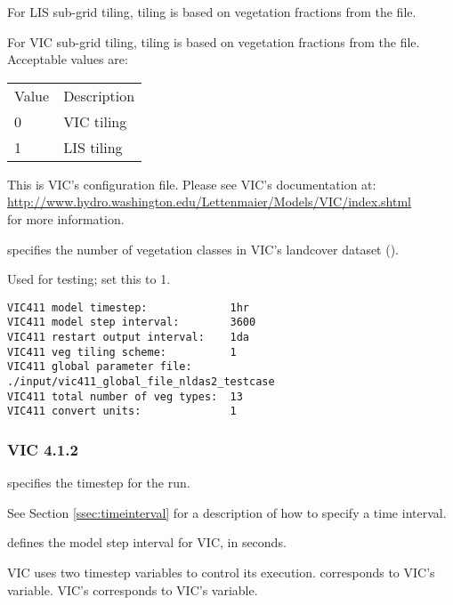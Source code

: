  For LIS sub-grid tiling, tiling is based on vegetation fractions
 from the  file.

 For VIC sub-grid tiling, tiling is based on vegetation fractions
 from the  file.
 Acceptable values are:

 \begin{tabular}{ll}
 Value & Description \\
 0     & VIC tiling  \\
 1     & LIS tiling  \\
 \end{tabular}

  This is VIC's
 configuration file.  Please see VIC's documentation at: \\
 \hyperref{http://www.hydro.washington.edu/Lettenmaier/Models/VIC/index.shtml}{}{}{http://www.hydro.washington.edu/Lettenmaier/Models/VIC/index.shtml} \\
 for more information.

  specifies the
 number of vegetation classes in VIC's landcover dataset
 ().

  Used for testing; set this to 1.
 

 \begin{Verbatim}[frame=single]
VIC411 model timestep:             1hr
VIC411 model step interval:        3600
VIC411 restart output interval:    1da
VIC411 veg tiling scheme:          1
VIC411 global parameter file:      ./input/vic411_global_file_nldas2_testcase
VIC411 total number of veg types:  13
VIC411 convert units:              1
 \end{Verbatim}

 
 \subsubsection{VIC 4.1.2} \label{sssec:lsm_vic412}
 

 
  specifies the timestep for the run.

 See Section \ref{ssec:timeinterval} for a description
 of how to specify a time interval.

  defines the model step
 interval for VIC, in seconds.

 VIC uses two timestep variables to control its execution.
  corresponds to VIC's
  variable.  VIC's 
 corresponds to VIC's  variable.


